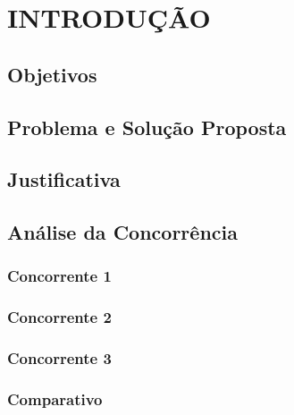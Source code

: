 
\chapter{INTRODUÇÃO}
\section{Objetivos}
\section{Problema e Solução Proposta}
\section{Justificativa}
\section{Análise da Concorrência}
\subsection{Concorrente 1}
\subsection{Concorrente 2}
\subsection{Concorrente 3}
\subsection{Comparativo}